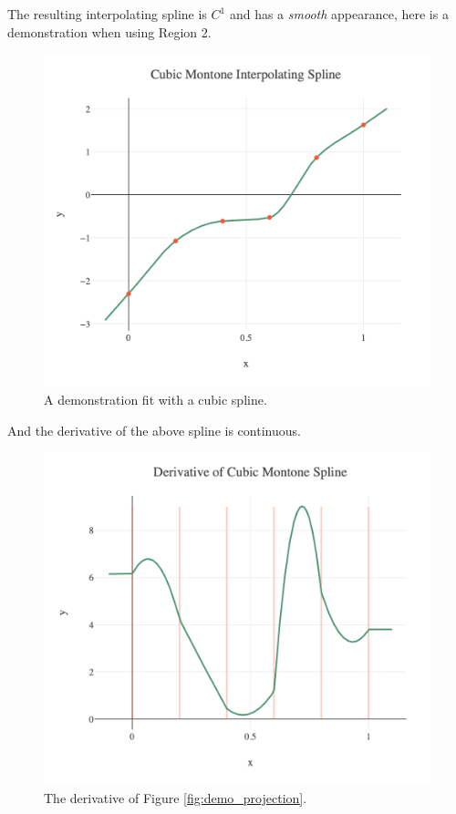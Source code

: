 The resulting interpolating spline is $C^1$ and has a \textit{smooth} appearance, here is a demonstration when using Region 2.

\begin{figure}[htb]
  \centering
  \includegraphics[scale=0.5]{Figures/splines/demo_fit.png}
  \caption{A demonstration fit with a cubic spline.}
  \label{fig:demo_fit}
\end{figure}

And the derivative of the above spline is continuous.

\begin{figure}[htb]
  \centering
  \includegraphics[scale=0.5]{./Figures/splines/demo_fit_deriv.png}
  \caption{The derivative of Figure \ref{fig:demo_projection}.}
  \label{fig:demo_fit_deriv}
\end{figure}

